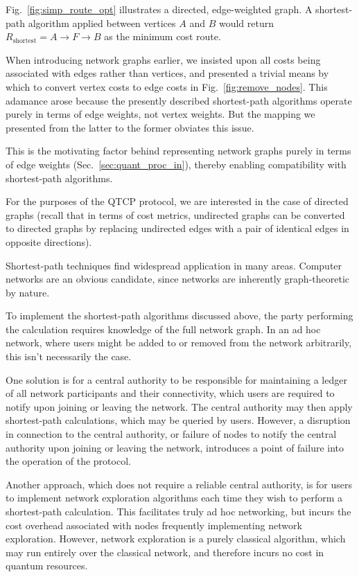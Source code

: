 \documentclass[aps, rmp, twocolumn, amsmath, amssymb, nofootinbib, superscriptaddress, longbibliography, floatfix, table-of-contents, eqsecnum]{revtex4-1}
\begin{document}
Fig.~\ref{fig:simp_route_opt} illustrates a directed, edge-weighted graph. A shortest-path algorithm applied between vertices $A$ and $B$ would return \mbox{$R_\text{shortest} = A\to F\to B$} as the minimum cost route.

When introducing network graphs earlier, we insisted upon all costs being associated with edges rather than vertices, and presented a trivial means by which to convert vertex costs to edge costs in Fig.~\ref{fig:remove_nodes}. This adamance arose because the presently described shortest-path algorithms operate purely in terms of edge weights, not vertex weights. But the mapping we presented from the latter to the former obviates this issue.

This is the motivating factor behind representing network graphs purely in terms of edge weights (Sec.~\ref{sec:quant_proc_in}), thereby enabling compatibility with shortest-path algorithms.

For the purposes of the QTCP protocol, we are interested in the case of directed graphs (recall that in terms of cost metrics, undirected graphs can be converted to directed graphs by replacing undirected edges with a pair of identical edges in opposite directions).

Shortest-path techniques find widespread application in many areas. Computer networks are an obvious candidate, since networks are inherently graph-theoretic by nature.

To implement the shortest-path algorithms discussed above, the party performing the calculation requires knowledge of the full network graph. In an ad hoc network, where users might be added to or removed from the network arbitrarily, this isn't necessarily the case.

One solution is for a central authority to be responsible for maintaining a ledger of all network participants and their connectivity, which users are required to notify upon joining or leaving the network. The central authority may then apply shortest-path calculations, which may be queried by users. However, a disruption in connection to the central authority, or failure of nodes to notify the central authority upon joining or leaving the network, introduces a point of failure into the operation of the protocol.

Another approach, which does not require a reliable central authority, is for users to implement network exploration algorithms each time they wish to perform a shortest-path calculation. This facilitates truly ad hoc networking, but incurs the cost overhead associated with nodes frequently implementing network exploration. However, network exploration is a purely classical algorithm, which may run entirely over the classical network, and therefore incurs no cost in quantum resources.
\end{document}
